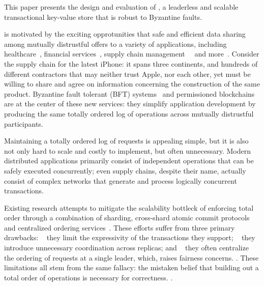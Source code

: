 This paper presents the design and evaluation of \sys{},  a leaderless and scalable transactional key-value store that is robust to Byzantine faults.

\sys{} is motivated by the exciting opprotunities that safe and efficient data sharing among mutually distrustful offers to a variety of applications, including healthcare~\cite{}, financial services~\cite{}, supply chain management~~\cite{} and more~\cite{}. Consider the supply chain for the latest iPhone: it spans three continents, and hundreds of different contractors \cite{AppleSup} that may neither trust Apple, nor each other, yet must be willing to share and agree on information concerning the construction of the same product.  Byzantine fault tolerant (BFT) systems~\cite{castro1999practical,martin2006fast,kotla2007zyzzyva, gueta2018sbft,clement2009making,buchman2016tendermint,yin2019hotstuff,Clement09Upright,duan2014hbft, pires2018generalized,bessani2014state,lamport2011byzantizing,arun2019ezbft, malkhi2019flexible,duan2014hbft,yin2003separating, Guerraoui08Next, Kotla04High,liskov2010viewstamped} and permissioned blockchains~\cite{Hyperledger,EthereumQuorum, buchman2016tendermint, al2017chainspace,kokoris2018omniledger,gilad2017algorand, baudet2019state} are at the center of these new services: they simplify application development by  producing the same totally ordered log of operations across mutually distrustful participants. 

Maintaining a totally ordered log of requests is appealing simple, but it is also not only hard to scale and costly to implement, but often unnecessary. Modern distributed applications primarily consist of independent operations that can be safely executed concurrently; even supply chains, despite their name, actually consist of complex networks that generate and process logically concurrent transactions.

Existing research attempts to mitigate the scalability bottleck of enforcing total order through a combination of sharding, cross-shard atomic commit protocols and centralized ordering services~\cite{kokoris2018omniledger,al2017chainspace,padilha2016callinicos}. These efforts suffer from three primary drawbacks: \one ~ they limit the expressivity of the transactions they support; \two ~ they introduce unnecessary coordination across replicas; and 
\three ~ they often centralize the ordering of requests at a single leader, which,  raises fairness  concerns. . These limitations all stem from the same fallacy: the mistaken belief that building out a total order of operations is necessary for correctness.  .


